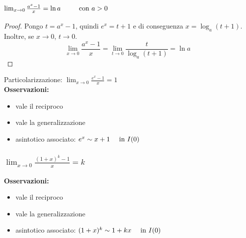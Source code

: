 \documentclass{book}     %
\begin{document}
\subsubsection{$\lim_{x\to 0}\frac{a^x-1}{x}=\ln a~~~~~~~~\textnormal{con }a>0$}
\begin{proof}
Pongo $t=a^x-1$, quindi $e^x=t+1$ e di conseguenza $x=\log_a (t+1)$. Inoltre, se $x\to 0$, $t\to 0$.
\[\lim_{x\to 0}\frac{a^x-1}{x}=\lim_{t\to 0}\frac{t}{\log_a (t+1)}=\ln a\]
\end{proof}
Particolarizzazione: $\lim_{x\to 0}\frac{e^x-1}{x}=1$\\
\textbf{Osservazioni:}
\begin{itemize}
    \item vale il reciproco
    \item vale la generalizzazione
    \item asintotico associato: $e^x \sim x + 1 ~~~~\textnormal{in } I(0)$
\end{itemize}

\subsubsection{$\lim_{x\to 0}\frac{(1+x)^k-1}{x}=k$}
\textbf{Osservazioni:}
\begin{itemize}
    \item vale il reciproco
    \item vale la generalizzazione
    \item asintotico associato: $(1+x)^k \sim 1+kx ~~~~\textnormal{in } I(0)$
\end{itemize}
\end{document}
